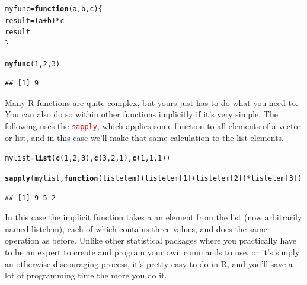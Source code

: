 \documentclass[english,nohyper,titlepage]{tufte-handout}\usepackage[]{graphicx}\usepackage[]{color}
\makeatletter
\newcommand{\hlnum}[1]{\textcolor[rgb]{0.686,0.059,0.569}{#1}}%
\newcommand{\hlopt}[1]{\textcolor[rgb]{0,0,0}{#1}}%
\newcommand{\hlstd}[1]{\textcolor[rgb]{0.345,0.345,0.345}{#1}}%
\newcommand{\hlkwa}[1]{\textcolor[rgb]{0.161,0.373,0.58}{\textbf{#1}}}%
\newcommand{\hlkwb}[1]{\textcolor[rgb]{0.69,0.353,0.396}{#1}}%
\newcommand{\hlkwc}[1]{\textcolor[rgb]{0.333,0.667,0.333}{#1}}%
\newcommand{\hlkwd}[1]{\textcolor[rgb]{0.737,0.353,0.396}{\textbf{#1}}}%
\newenvironment{kframe}{%
 \def\at@end@of@kframe{}%
 \ifinner\ifhmode%
  \def\at@end@of@kframe{\end{minipage}}%
  \begin{minipage}{\columnwidth}%
 \fi\fi%
 \def\FrameCommand##1{\hskip\@totalleftmargin \hskip-\fboxsep
 \colorbox{shadecolor}{##1}\hskip-\fboxsep
     \hskip-\linewidth \hskip-\@totalleftmargin \hskip\columnwidth}%
 \MakeFramed {\advance\hsize-\width
   \@totalleftmargin\z@ \linewidth\hsize
   \@setminipage}}%
 {\par\unskip\endMakeFramed%
 \at@end@of@kframe}
\newenvironment{knitrout}{}{} %
\makeatother
\begin{document}
\begin{knitrout}\footnotesize
{}\color{fgcolor}\begin{kframe}
\begin{alltt}
\hlstd{myfunc} \hlkwb{=} \hlkwa{function}\hlstd{(}\hlkwc{a}\hlstd{,} \hlkwc{b}\hlstd{,} \hlkwc{c}\hlstd{)\{}
  \hlstd{result} \hlkwb{=} \hlstd{(a} \hlopt{+} \hlstd{b)} \hlopt{*} \hlstd{c}
  \hlstd{result}
\hlstd{\}}

\hlkwd{myfunc}\hlstd{(}\hlnum{1}\hlstd{,} \hlnum{2}\hlstd{,} \hlnum{3}\hlstd{)}
\end{alltt}
\begin{verbatim}
## [1] 9
\end{verbatim}
\end{kframe}
\end{knitrout}

Many R functions are quite complex, but yours just has to do what you need to.  You can also do so within other functions implicitly if it's very simple.  The following uses the \texttt{\textcolor{red}{sapply}}, which applies some function to all elements of a vector or list, and in this case we'll make that same calculation to the list elements.

\begin{knitrout}\footnotesize
{}\color{fgcolor}\begin{kframe}
\begin{alltt}
\hlstd{mylist} \hlkwb{=} \hlkwd{list}\hlstd{(}\hlkwd{c}\hlstd{(}\hlnum{1}\hlstd{,}\hlnum{2}\hlstd{,}\hlnum{3}\hlstd{),} \hlkwd{c}\hlstd{(}\hlnum{3}\hlstd{,}\hlnum{2}\hlstd{,}\hlnum{1}\hlstd{),} \hlkwd{c}\hlstd{(}\hlnum{1}\hlstd{,}\hlnum{1}\hlstd{,}\hlnum{1}\hlstd{))}

\hlkwd{sapply}\hlstd{(mylist,} \hlkwa{function}\hlstd{(}\hlkwc{listelem}\hlstd{) (listelem[}\hlnum{1}\hlstd{]} \hlopt{+} \hlstd{listelem[}\hlnum{2}\hlstd{])} \hlopt{*} \hlstd{listelem[}\hlnum{3}\hlstd{])}
\end{alltt}
\begin{verbatim}
## [1] 9 5 2
\end{verbatim}
\end{kframe}
\end{knitrout}


In this case the implicit function takes a an element from the list (now arbitrarily named listelem), each of which contains three values, and does the same operation as before.   Unlike other statistical packages where you practically have to be an expert to create and program your own commands to use, or it's simply an otherwise discouraging process, it's pretty easy to do in R, and you'll save a lot of programming time the more you do it.
\end{document}
